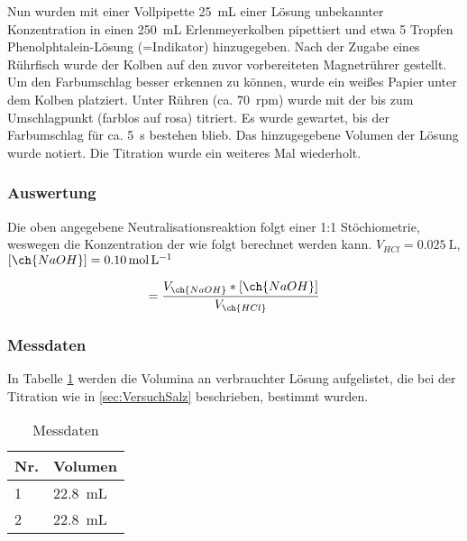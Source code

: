 \documentclass{article}
\begin{document}
        Nun wurden mit einer Vollpipette \SI[mode=text]{25}{\milli\liter} einer  Lösung unbekannter Konzentration in einen \SI[mode=text]{250}{\milli\liter} Erlenmeyerkolben pipettiert und etwa 5 Tropfen Phenolphtalein-Lösung (=Indikator) hinzugegeben. Nach der Zugabe eines Rührfisch wurde der Kolben auf den zuvor vorbereiteten Magnetrührer gestellt. Um den Farbumschlag besser erkennen zu können, wurde ein weißes Papier unter dem Kolben platziert.  Unter Rühren (ca. \SI[mode=text]{70}{rpm}) wurde mit der  bis zum Umschlagpunkt (farblos auf rosa) titriert. Es wurde gewartet, bis der Farbumschlag für ca. \SI[mode=text]{5}{\second} bestehen blieb. Das hinzugegebene Volumen der  Lösung wurde notiert. Die Titration wurde ein weiteres Mal wiederholt. 
      
      \pagebreak
      
      \subsubsection{Auswertung}
        
         Die oben angegebene Neutralisationsreaktion folgt einer 1:1 Stöchiometrie, weswegen die Konzentration der  wie folgt berechnet werden kann. $V_{HCl} = \SI[mode=text]{0.025}{\liter}$, $[\ch{NaOH}] = \SI[mode=text]{0.10}{\mole\per\liter}$
         
         \begin{equation}
           [\ch{HCl}] = \frac{V_{\ch{NaOH}} * [\ch{NaOH}]}{V_{\ch{HCl}}} \label{eq:Hcl}
         \end{equation}
        
      \subsubsection{Messdaten}
        
        In Tabelle \ref{tab:MessdatenSalz} werden die Volumina an verbrauchter  Lösung aufgelistet, die bei der Titration wie in \ref{sec:VersuchSalz} beschrieben, bestimmt wurden. 
        
        \begin{table}[H]
          \centering
          \caption[Messdaten der Bestimmung der Konzentration einer Salzsäure, Quelle: Autor]{Messdaten}
          \label{tab:MessdatenSalz}
            \begin{tabular}{@{}l|l@{}}
              \toprule
               Nr. & Volumen \\ \midrule
               1 & \SI[mode=text]{22.8}{\milli\liter} \\
               2 & \SI[mode=text]{22.8}{\milli\liter} \\ \bottomrule
            \end{tabular}
        \end{table} 
        
\end{document}
